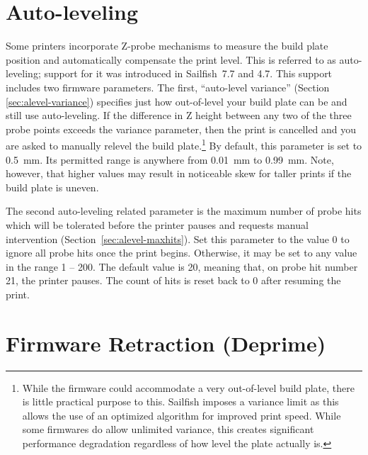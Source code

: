 
\section{Auto-leveling} \label{sec:alevel-params}

Some printers incorporate Z-probe mechanisms to measure the build plate position and automatically compensate the print level.  This is referred to as auto-leveling; support for it was introduced in Sailfish~7.7 and 4.7.  This support includes two firmware parameters.  The first, ``auto-level variance'' (Section \ref{sec:alevel-variance}) specifies just how out-of-level your build plate can be and still use auto-leveling.  If the difference in Z height between any two of the three probe points exceeds the variance parameter, then the print is cancelled and you are asked to manually relevel the build plate.\footnote{While the firmware could accommodate a very out-of-level build plate, there is little practical purpose to this.  Sailfish imposes a variance limit as this allows the use of an optimized algorithm for improved print speed.  While some firmwares do allow unlimited variance, this creates significant performance degradation regardless of how level the plate actually is.}  By default, this parameter is set to 0.5~mm.  Its permitted range is anywhere from 0.01~mm to 0.99~mm.  Note, however, that higher values may result in noticeable skew for taller prints if the build plate is uneven.

The second auto-leveling related parameter is the maximum number of probe hits which will be tolerated before the printer pauses and requests manual intervention (Section~\ref{sec:alevel-maxhits}). Set this parameter to the value 0 to ignore all probe hits once the print begins.  Otherwise, it may be set to any value in the range 1 -- 200.  The default value is 20, meaning that, on probe hit number 21, the printer pauses.  The count of hits is reset back to 0 after resuming the print.


\section{Firmware Retraction (Deprime)} \label{sec:deprime}

